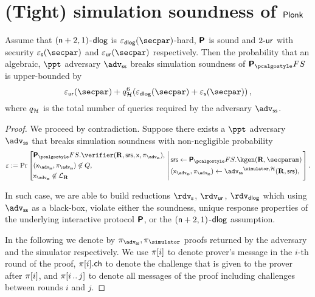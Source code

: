 \documentclass[runningheads,11pt]{llncs}
\begin{document}
\section{(Tight) simulation soundness of $\textnormal{\textsf{Plonk}}$}
\begin{theorem}
  Assume that $(\mathsf{n} + 2, 1)$-$\mathsf{dlog}$ is
  $\eps_\dlog(\secpar)$-hard, $\bm{\mathsf{P}}$ is sound and ${2\text{-}\mathsf{ur}}$ with security
  $\epss(\secpar)$ and $\epsur(\secpar)$ respectively. Then the probability that
  an algebraic, $\ppt$ adversary $\advss$ breaks simulation soundness of
  $\plonkprotfs$ is upper-bounded by
  \[
    \epsur(\secpar) + q_\ro^6 (\eps_{\dlog}(\secpar) + \epss(\secpar))\,,
  \]
  where $q_{\mathcal{H}}$ is the total number of queries required by the adversary
  $\advss$.
\end{theorem}
\begin{proof}
  We proceed by contradiction. Suppose there exists a $\ppt$ adversary $\advss$
  that breaks simulation soundness with non-negligible probability
  \[
    \eps := \Pr \left[
      \begin{aligned}
        & \plonkprotfs.\verifier(\REL, \srs, \inp, \zkproof_{\advss}),\\
        & (\inp_{\advss}, \zkproof_{\advss}) \not\in Q,\\
        & \inp_\advss \not\in \LANG_\REL
      \end{aligned}
      \,\left|\, \vphantom{\begin{aligned}
            & \plonkprotfs.\verifier(\REL, \srs, \inp, \zkproof_{\advss}),\\
            & (\inp_{\advss}, \zkproof_{\advss}) \not\in Q,\\
            & \inp_\advss \not\in \LANG_\REL
          \end{aligned}}
        \begin{aligned}
          & \srs \gets \plonkprotfs.\kgen(\REL, \secparam)\\
          & (\inp_{\advss}, \zkproof_{\advss}) \gets \advss^{\simulator, \ro}
          (\REL, \srs),
        \end{aligned}
      \right.\right].
  \]

  In such case, we are able to build reductions $\rdvs$, $\rdvur$, $\rdvdlog$
  which using $\advss$ as a black-box, violate either the soundness, unique
  response properties of the underlying interactive protocol $\bm{\mathsf{P}}$, or
  the $(\mathsf{n} + 2, 1)$-$\mathsf{dlog}$ assumption.

  In the following we denote by $\zkproof_{\advss}, \zkproof_{\simulator}$
  proofs returned by the adversary and the simulator respectively. We use
  $\pi[i]$ to denote prover's message in the $i$-th round of the proof,
  $\pi[i].\mathsf{ch}$ to denote the challenge that is given to the prover after
  $\pi[i]$, and $\pi[i \, .. \, j]$ to denote all messages of the proof
  including challenges between rounds $i$ and $j$.


\end{proof}
\end{document}
